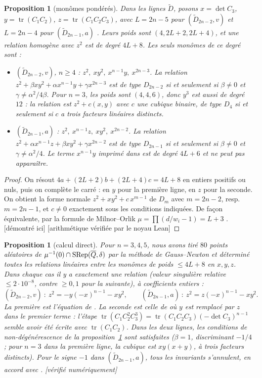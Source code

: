 \documentclass[11pt]{article}
\newtheorem{proposition}[theorem]{Proposition}
\theoremstyle{definition}
\theoremstyle{remark}
\newcommand{\tagP}{\textsf{\small[démontré ici]}}
\newcommand{\tagN}{\textsf{\small[vérifié numériquement]}}
\newcommand{\tagK}{\textsf{\small[arithmétique vérifiée par le noyau Lean]}}
\begin{document}
\begin{proposition}[monômes pondérés]\label{prop:enum}
Dans les lignes $\widetilde D$, posons $x=\det C_3$, $y=\operatorname{tr}(C_1C_2)$, $z=\operatorname{tr}(C_1C_2C_3)$, avec $L=2n-5$ pour $(\widetilde D_{2n-2},v)$ et $L=2n-4$ pour $(\widetilde D_{2n-1},a)$ \cite[p.~18]{Pin26}. Leurs poids sont $(4,2L+2,2L+4)$, et une relation homogène avec $z^2$ est de degré $4L+8$. Les seuls monômes de ce degré sont :
\begin{itemize}[leftmargin=*]
\item $(\widetilde D_{2n-2},v)$, $n\ge4$ : $z^2,\ xy^2,\ x^{n-1}y,\ x^{2n-3}$. La relation $z^2+\beta xy^2+\alpha x^{n-1}y+\gamma x^{2n-3}$ est de type $D_{2n-2}$ si et seulement si $\beta\ne0$ et $\gamma\neq\alpha^2/4\beta$. Pour $n=3$, les poids sont $(4,4,6)$, donc $y^3$ est aussi de degré $12$ : la relation est $z^2+c(x,y)$ avec $c$ une cubique binaire, de type $D_4$ si et seulement si $c$ a trois facteurs linéaires distincts.
\item $(\widetilde D_{2n-1},a)$ : $z^2,\ x^{n-1}z,\ xy^2,\ x^{2n-2}$. La relation $z^2+\alpha x^{n-1}z+\beta xy^2+\gamma x^{2n-2}$ est de type $D_{2n-1}$ si et seulement si $\beta\ne0$ et $\gamma\ne\alpha^2/4$. Le terme $x^{n-1}y$ imprimé dans \cite[lemme~3.27]{Pin26} est de degré $4L+6$ et ne peut pas apparaître.
\end{itemize}
\end{proposition}
\begin{proof}
On résout $4a+(2L+2)b+(2L+4)c=4L+8$ en entiers positifs ou nuls, puis on complète le carré : en $y$ pour la première ligne, en $z$ pour la seconde. On obtient la forme normale $z^2+xy^2+c\,x^{m-1}$ de $D_m$ avec $m=2n-2$, resp.\ $m=2n-1$, et $c\neq0$ exactement sous les conditions indiquées. De façon équivalente, par la formule de Milnor--Orlik $\mu=\prod(d/w_i-1)=L+3$ \cite{MO70}. \tagP{} \tagK
\end{proof}

\begin{proposition}[calcul direct]\label{prop:numeric}
Pour $n=3,4,5$, nous avons tiré $80$ points aléatoires de $\mu^{-1}(0)\cap\mathrm{SRep}(\overline Q,\delta)$ par la méthode de Gauss--Newton et déterminé toutes les relations linéaires entre les monômes de poids $\le 4L+8$ en $x,y,z$. Dans chaque cas il y a exactement une relation (valeur singulière relative $\le2\cdot10^{-8}$, contre $\ge0{,}1$ pour la suivante), à coefficients entiers :
\[
(\widetilde D_{2n-2},v)\ :\ z^2=-y(-x)^{n-1}-xy^2,\qquad (\widetilde D_{2n-1},a)\ :\ z^2=z(-x)^{n-1}-xy^2 .
\]
La première est l'équation de \cite[lemme~3.28]{Pin26}. La seconde est celle de \cite[lemme~3.27]{Pin26} où $y$ est remplacé par $z$ dans le premier terme : l'étape $\operatorname{tr}(C_1C_2^2C_3^3)=\operatorname{tr}(C_1C_2C_3)(-\det C_3)^{n-1}$ semble avoir été écrite avec $\operatorname{tr}(C_1C_2)$. Dans les deux lignes, les conditions de non-dégénérescence de la proposition~\ref{prop:enum} sont satisfaites ($\beta=1$, discriminant $-1/4$ ; pour $n=3$ dans la première ligne, la cubique est $xy(x+y)$, à trois facteurs distincts). Pour le signe $-1$ dans $(\widetilde D_{2n-1},a)$, tous les invariants s'annulent, en accord avec \cite{Pin26}. \tagN
\end{proposition}
\end{document}
